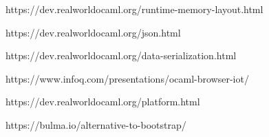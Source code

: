 \begin{thebibliography}{00}
    https://dev.realworldocaml.org/runtime-memory-layout.html \TODO

    https://dev.realworldocaml.org/json.html \TODO

    https://dev.realworldocaml.org/data-serialization.html \TODO

    https://www.infoq.com/presentations/ocaml-browser-iot/ \TODO

    https://dev.realworldocaml.org/platform.html \TODO

    https://bulma.io/alternative-to-bootstrap/ \TODO

\end{thebibliography}
\endgroup

